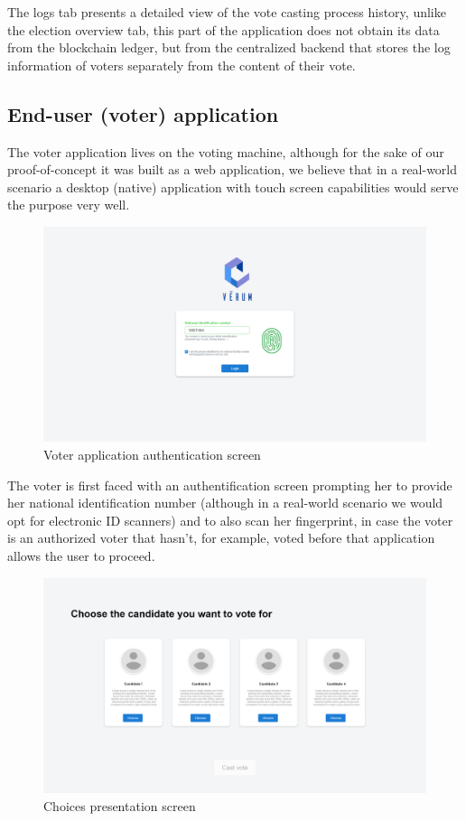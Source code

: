 The logs tab presents a detailed view of the vote casting process history, unlike the election overview tab, this part of the application does not obtain its data from the blockchain ledger, but from the centralized backend that stores the log information of voters separately from the content of their vote.

\subsection{End-user (voter) application}

The voter application lives on the voting machine, although for the sake of our proof-of-concept it was built as a web application, we believe that in a real-world scenario a desktop (native) application with touch screen capabilities would serve the purpose very well.

\begin{figure}[H]
	\centering
		\includegraphics[width=14cm]{images/chapter3/voter_2.png}
		\caption{{\footnotesize Voter application authentication screen}}
\end{figure}

The voter is first faced with an authentification screen prompting her to provide her national identification number (although in a real-world scenario we would opt for electronic ID scanners) and to also scan her fingerprint, in case the voter is an authorized voter that hasn't, for example, voted before that application allows the user to proceed.

\begin{figure}[H]
	\centering
		\includegraphics[width=14cm]{images/chapter3/voter_3.png}
		\caption{{\footnotesize Choices presentation screen}}
\end{figure}


